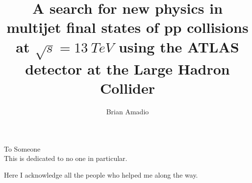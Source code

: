 \documentclass{ucbthesis}
\begin{document}

\title{A search for new physics in multijet
  final states of pp collisions at $\sqrt{s} = 13~TeV$ using the ATLAS
  detector at the Large Hadron Collider}

\author{Brian Amadio}




\maketitle
\copyrightpage



\begin{frontmatter}

\begin{dedication}
\null\vfil
\begin{center}

To Someone\\\vspace{12pt}
This is dedicated to no one in particular. 
\end{center}
\vfil\null
\end{dedication}


\tableofcontents
\clearpage
\listoffigures
\clearpage
\listoftables

\begin{acknowledgements}

Here I acknowledge all the people who helped me along the way.

\end{acknowledgements}

\end{frontmatter}

\pagestyle{headings}














\printbibliography
\end{document}
